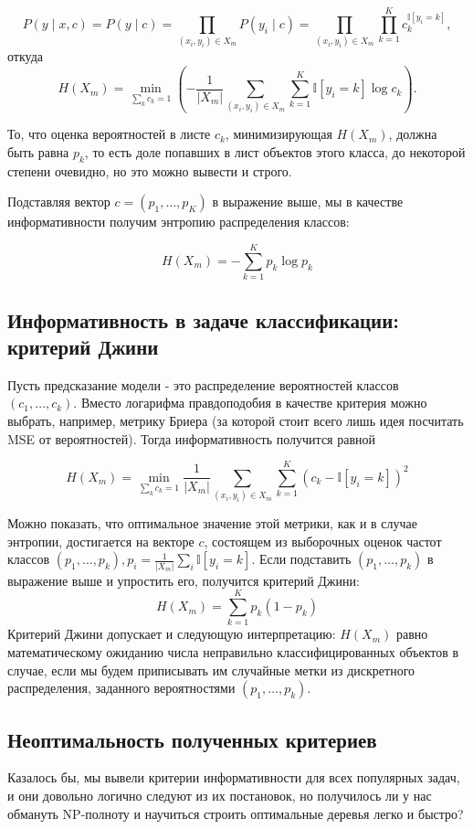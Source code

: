 \[
    P(y \mid x, c) = P(y \mid c) = \prod_{(x_i, y_i) \in X_m} P(y_i \mid c) = \prod_{(x_i, y_i) \in X_m} \prod_{k=1}^K c_k^{\mathbb{I}[y_i = k]},
\]
откуда
\[
    H(X_m) = \min_{\sum_k c_k = 1} \left( - \frac{1}{|X_m|} \sum_{(x_i, y_i) \in X_m} \sum_{k=1}^K \mathbb{I}[y_i = k] \log c_k \right).
\]

То, что оценка вероятностей в листе \(c_{k}\), минимизирующая \(H\left(X_{m}\right)\), должна быть равна \(p_{k}\), то есть доле попавших в лист объектов этого класса, до некоторой степени очевидно, но это можно вывести и строго.

Подставляя вектор \(c=\left(p_{1}, \ldots, p_{K}\right)\) в выражение выше, мы в качестве информативности получим энтропию распределения классов:

\[
    H\left(X_{m}\right)=-\sum_{k=1}^{K} p_{k} \log p_{k}
\]

\subsection*{Информативность в задаче классификации: критерий Джини}
Пусть предсказание модели - это распределение вероятностей классов \(\left(c_{1}, \ldots, c_{k}\right)\). Вместо логарифма правдоподобия в качестве критерия можно выбрать, например, метрику Бриера (за которой стоит всего лишь идея посчитать MSE от вероятностей). Тогда информативность получится равной

\[
    H\left(X_{m}\right)=\min _{\sum_{k} c_{k}=1} \frac{1}{\left|X_{m}\right|} \sum_{\left(x_{i}, y_{i}\right) \in X_{m}} \sum_{k=1}^{K}\left(c_{k}-\mathbb{I}\left[y_{i}=k\right]\right)^{2}
\]

Можно показать, что оптимальное значение этой метрики, как и в случае энтропии, достигается на векторе \(c\), состоящем из выборочных оценок частот классов \(\left(p_{1}, \ldots, p_{k}\right), p_{i}=\frac{1}{\left|X_{m}\right|} \sum_{i} \mathbb{I}\left[y_{i}=k\right]\). Если подставить
\(\left(p_{1}, \ldots, p_{k}\right)\) в выражение выше и упростить его, получится критерий Джини:
\[
    H\left(X_{m}\right)=\sum_{k=1}^{K} p_{k}\left(1-p_{k}\right)
\]
Критерий Джини допускает и следующую интерпретацию: \(H\left(X_{m}\right)\) равно математическому ожиданию числа неправильно классифицированных объектов в случае, если мы будем приписывать им случайные метки из дискретного распределения, заданного вероятностями \(\left(p_{1}, \ldots, p_{k}\right)\).

\subsection*{Неоптимальность полученных критериев}
Казалось бы, мы вывели критерии информативности для всех популярных задач, и они довольно логично следуют из их постановок, но получилось ли у нас обмануть NP-полноту и научиться строить оптимальные деревья легко и быстро?

